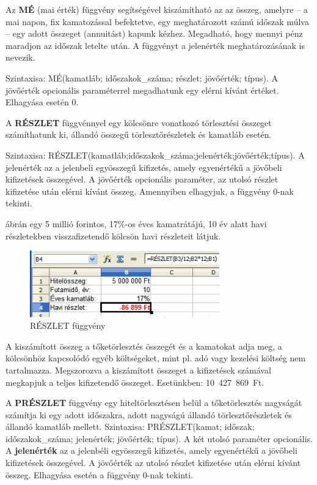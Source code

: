Az \textbf{MÉ} (mai érték) függvény segítségével kiszámítható az az
összeg, amelyre --  a mai napon, fix kamatozással befektetve, egy
meghatározott számú időszak múlva --  egy adott összeget
(annuitást) kapunk kézhez.  Megadható, hogy mennyi pénz
maradjon az időszak letelte után. A függvényt a
jelenérték meghatározásának is nevezik.

Szintaxisa: MÉ(kamatláb; időszakok\_száma; részlet;
jövőérték; típus). A jövőérték opcionális
paraméterrel megadhatunk egy elérni kívánt értéket.
Elhagyása esetén 0.

A \textbf{RÉSZLET} függvénnyel egy kölcsönre vonatkozó
törlesztési összeget számíthatunk ki, állandó
összegű törlesztőrészletek és kamatláb esetén.

Szintaxisa:
RÉSZLET(kamatláb;időszakok\_száma;jelenérték;jövőérték;típus).
A jelenérték az a jelenbeli egyösszegű kifizetés, amely
egyenértékű a jövőbeli kifizetések összegével. A
jövőérték opcionális paraméter, az utolsó részlet
kifizetése után elérni kívánt összeg. Amennyiben elhagyjuk,
a függvény 0-nak tekinti.

 ábrán egy 5 millió forintos, 17\%-os éves
kamatrátájú, 10 év alatt havi részletekben visszafizetendő
kölcsön havi részleteit látjuk.

\begin{figure}[!h]
\begin{center}
\includegraphics[width=8.206cm]{oocalcv2-img127.png}
\caption{RÉSZLET függvény}\label{29-feladatPMT}
\end{center}
\end{figure}

A kiszámított összeg a tőketörlesztés összegét és a
kamatokat adja meg, a kölcsönhöz kapcsolódó egyéb
költségeket, mint pl. adó vagy kezelési költség nem
tartalmazza. Megszorozva a kiszámított összeget a kifizetések
számával megkapjuk a teljes kifizetendő összeget.
Esetünkben:  10~427~869~Ft.

A \textbf{PRÉSZLET} függvény egy hiteltörlesztésen belül a
tőketörlesztés nagyságát számítja ki egy adott
időszakra, adott nagyságú állandó
törlesztőrészletek és állandó kamatláb mellett.
Szintaxisa: PRÉSZLET(kamat; időszak; időszakok\_száma;
jelenérték; jövőérték; típus). A két utolsó
paraméter opcionális.  A \textbf{jelenérték} az a jelenbéli
egyösszegű kifizetés, amely egyenértékű a
jövőbeli kifizetések összegével. A jövőérték az
utolsó részlet kifizetése után elérni kívánt összeg.
Elhagyása esetén a függvény 0-nak tekinti.

